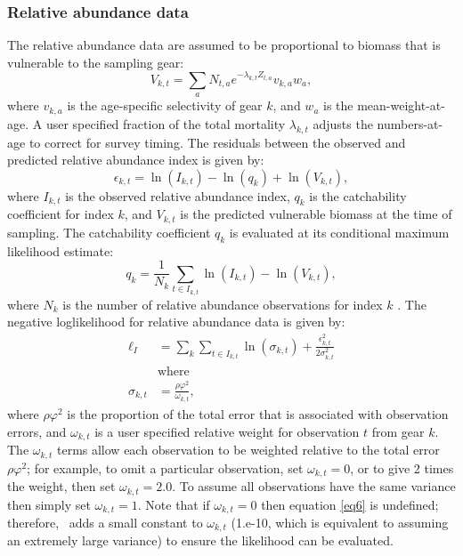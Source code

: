 \begin{multicols}{2}
\subsubsection{Relative abundance data}
The relative abundance data are assumed to be proportional to biomass that is vulnerable to the sampling gear:
\begin{equation}\label{eq4}
 V_{k,t} = \sum_a N_{t,a} e^{-\lambda_{k,t} Z_{t,a}} v_{k,a} w_a,
\end{equation}
where $v_{k,a}$ is the age-specific selectivity of gear $k$, and $w_a$ is the mean-weight-at-age. A user specified fraction of the total mortality $\lambda_{k,t}$ adjusts the numbers-at-age to correct for survey timing.  The residuals between the observed and predicted relative abundance index is given by:
\begin{equation}\label{eq5}
\epsilon_{k,t} = \ln(I_{k,t}) - \ln(q_k)+\ln(V_{k,t}),
\end{equation}
where $I_{k,t}$ is the observed relative abundance index, $q_k$ is the catchability coefficient for index $k$, and $V_{k,t}$ is the predicted vulnerable biomass at the time of sampling.  The catchability coefficient $q_k$ is evaluated at its conditional maximum likelihood estimate:
\[
  q_k =\frac{1}{N_k} \sum_{t \in I_{k,t}} \ln(I_{k,t}) - \ln(V_{k,t}),
\]
where $N_k$ is the number of relative abundance observations for index $k$ \citep[see][for more information]{walters1994calculation}. The negative loglikelihood for relative abundance data is given by:
\begin{align}
\ell_I &= \sum_k \sum_{t \in I_{k,t}}  \ln(\sigma_{k,t})+\frac{\epsilon_{k,t}^2}{2\sigma_{k,t}^2} \label{eq6}\\
&\mbox{where}\nonumber\\
\sigma_{k,t} &= \frac{\rho \varphi^2}{ \omega_{k,t}},  \nonumber
\end{align}
where $\rho \varphi^2$ is the proportion of the total error that is associated with observation errors, and $\omega_{k,t}$ is a user specified relative weight for observation $t$ from gear $k$.  The $ \omega_{k,t}$ terms allow each observation to be weighted relative to the total error $\rho \varphi^2$; for example, to omit a particular observation, set $\omega_{k,t}=0$, or to give 2 times the weight, then set  $\omega_{k,t}=2.0$. To assume all observations have the same variance then simply set  $\omega_{k,t}=1$.  Note that if  $\omega_{k,t}=0$ then equation \eqref{eq6} is undefined; therefore, \iscam\ adds a small constant to  $\omega_{k,t}$ (1.e-10, which is equivalent to assuming an extremely large variance)  to ensure the likelihood can be evaluated.


\end{multicols}
